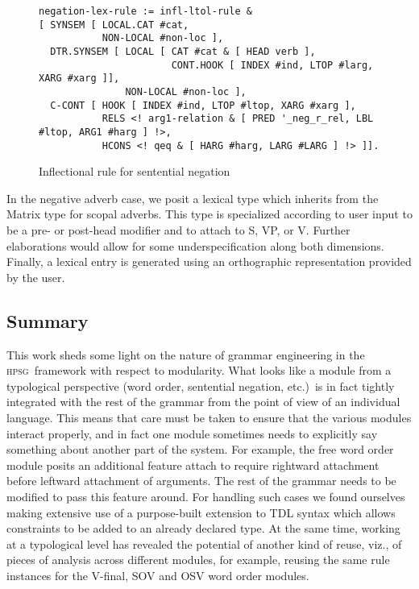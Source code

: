 \documentclass[11pt]{article}
\newcommand{\hpsg}{\textsc{hpsg}}
\begin{document}
\begin{figure}[ht]
{\scriptsize
\begin{verbatim}
negation-lex-rule := infl-ltol-rule &
[ SYNSEM [ LOCAL.CAT #cat,
           NON-LOCAL #non-loc ],
  DTR.SYNSEM [ LOCAL [ CAT #cat & [ HEAD verb ],
                       CONT.HOOK [ INDEX #ind, LTOP #larg, XARG #xarg ]],
               NON-LOCAL #non-loc ],
  C-CONT [ HOOK [ INDEX #ind, LTOP #ltop, XARG #xarg ],
           RELS <! arg1-relation & [ PRED '_neg_r_rel, LBL #ltop, ARG1 #harg ] !>,
           HCONS <! qeq & [ HARG #harg, LARG #LARG ] !> ]].
\end{verbatim}
}
\caption{Inflectional rule for sentential negation}
\label{negrulefig}
\end{figure}

In the negative adverb case, we posit a lexical type which inherits
from the Matrix type for scopal adverbs.  This type is specialized
according to user input to be a pre- or post-head modifier and to
attach to S, VP, or V.  Further elaborations would allow for some
underspecification along both dimensions.  Finally, a lexical entry is
generated using an orthographic representation
provided by the user.

\subsection{Summary}

This work sheds some light on the nature of grammar engineering in the
\hpsg\ framework with respect to modularity.  What looks like a module
from a typological perspective (word order, sentential negation,
etc.)\ is in fact tightly integrated with the rest of the grammar from
the point of view of an individual language.  
This means that care must be taken to ensure that the various
modules interact properly, and in fact one module sometimes needs to
explicitly say something about another part of the system.  For
example, the free word order module posits an additional feature {\sc
attach} to require rightward attachment before leftward attachment of
arguments.  The rest of the grammar needs to be modified to pass this
feature around.  For handling such cases we found ourselves making
extensive use of a purpose-built extension to TDL syntax which allows
constraints to be added to an already declared type.  At the same
time, working at a typological level has revealed 
the potential of another kind of reuse, viz., of
pieces of analysis across
different modules, for example, reusing the same rule instances for
the V-final, SOV and OSV word order modules.
\end{document}
